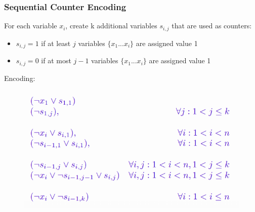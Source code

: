 \documentclass[10pt,a4paper]{report}
\begin{document}
\subsubsection{Sequential Counter Encoding}
For each variable $x_i$, create k additional variables $s_{i,j}$ that are used as counters:
\begin{itemize}
    \item $s_{i,j} = 1$ if at least $j$ variables $\{x_1 ... x_i\}$ are assigned value 1
    \item $s_{i,j} = 0$ if at most $j - 1$ variables $\{x_1 ... x_i\}$ are assigned value 1
\end{itemize}
Encoding:
\begin{figure}[H]
    \centering
    \includegraphics[scale=0.4]{1.png}
\end{figure}
\end{document}
